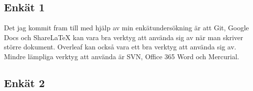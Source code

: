 \subsection{Enkät 1}
Det jag kommit fram till med hjälp av min enkätundersökning är att Git, Google Docs och ShareLaTeX kan vara bra verktyg att använda sig av när man skriver större dokument. Overleaf kan också vara ett bra verktyg att använda sig av. Mindre lämpliga verktyg att använda är SVN, Office 365 Word och Mercurial.

\subsection{Enkät 2}


